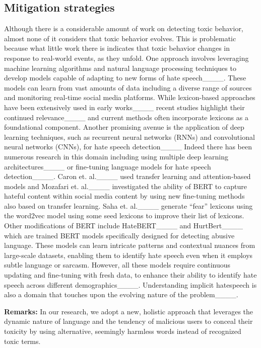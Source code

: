 \subsection{Mitigation strategies}
Although there is a considerable amount of work on detecting toxic behavior, almost none of it considers that toxic behavior evolves.
This is problematic because what little work there is indicates that toxic behavior changes in response to real-world events, as they unfold.
One approach involves leveraging machine learning algorithms and natural language processing techniques to develop models capable of adapting to new forms of hate speech____.
These models can learn from vast amounts of data including a diverse range of sources and monitoring real-time social media platforms. While lexicon-based approaches have been extensively used in early works____ recent studies highlight their continued relevance____ and current methods often incorporate lexicons as a foundational component. 
Another promising avenue is the application of deep learning techniques, such as recurrent neural networks (RNNs) and convolutional neural networks (CNNs), for hate speech detection____
Indeed there has been numerous research in this domain including using multiple deep learning architectures____ or fine-tuning language models for hate speech detection____.
Caron et. al.____ used transfer learning and attention-based models and Mozafari et. al.____ investigated the ability of BERT to capture hateful content within social media content by using new fine-tuning methods also based on transfer learning. Saha et. al.____ generate ``fear'' lexicons using the word2vec model using some seed lexicons to improve their list of lexicons. Other modifications of BERT include HateBERT____ and HurtBert____ which are trained BERT models specifically designed for detecting abusive language. These models can learn intricate patterns and contextual nuances from large-scale datasets, enabling them to identify hate speech even when it employs subtle language or sarcasm. However, all these models require continuous updating and fine-tuning with fresh data, to enhance their ability to identify hate speech across different demographics____. Understanding implicit hatespeech is also a domain that touches upon the evolving nature of the problem____.

\noindent \textbf{Remarks: }In our research, we adopt a new, holistic approach that leverages the dynamic nature of language and the tendency of malicious users to conceal their toxicity by using alternative, seemingly harmless words instead of recognized toxic terms.